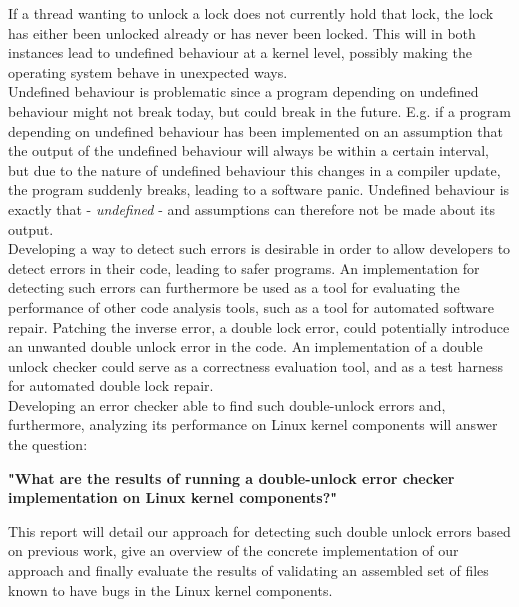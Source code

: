\noindent If a thread wanting to unlock a lock does not currently hold that lock, the lock has either been unlocked already or has never been locked. This will in both instances lead to undefined behaviour at a kernel level, possibly making the operating system behave in unexpected ways. \\

\noindent Undefined behaviour is problematic since a program depending on undefined behaviour might not break today, but could break in the future. E.g. if a program depending on undefined behaviour has been implemented on an assumption that the output of the undefined behaviour will always be within a certain interval, but due to the nature of undefined behaviour this changes in a compiler update, the program suddenly breaks, leading to a software panic. Undefined behaviour is exactly that - \textit{undefined} - and assumptions can therefore not be made about its output. \\

\noindent Developing a way to detect such errors is desirable in order to allow developers to detect errors in their code, leading to safer programs. An implementation for detecting such errors can furthermore be used as a tool for evaluating the performance of other code analysis tools, such as a tool for automated software repair. Patching the inverse error, a double lock error, could potentially introduce an unwanted double unlock error in the code. An implementation of a double unlock checker could serve as a correctness evaluation tool, and as a test harness for automated double lock repair. \\

\noindent Developing an error checker able to find such double-unlock errors and, furthermore, analyzing its performance on Linux kernel components will answer the question:

\begin{center}
    \textbf{"What are the results of running a double-unlock error checker implementation on Linux kernel components?"} 
\end{center}

\noindent This report will detail our approach for detecting such double unlock errors based on previous work, give an overview of the concrete implementation of our approach and finally evaluate the results of validating an assembled set of files known to have bugs in the Linux kernel components.